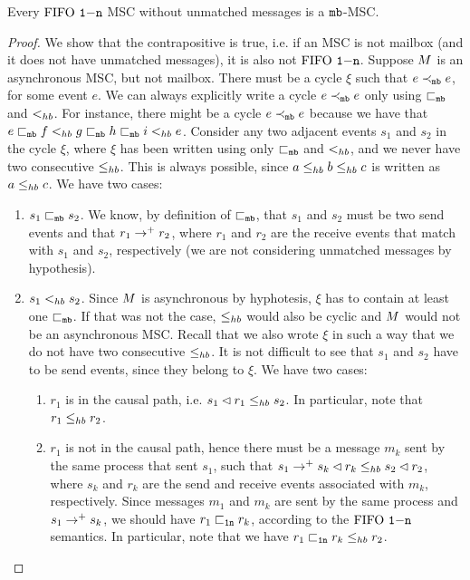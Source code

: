\begin{proposition} \label{prop:onen_mb_no_unmatched}
	Every $\text{FIFO } \mathtt{1\mathsf{-}n}$ MSC without unmatched messages is a $\mathtt{mb}$-MSC.
\end{proposition}
\begin{proof}
We show that the contrapositive is true, i.e. if an MSC is not mailbox (and it does not have unmatched messages), it is also not $\text{FIFO } \mathtt{1\mathsf{-}n}$. Suppose $M$ is an asynchronous MSC, but not mailbox. There must be a cycle $\xi$ such that  
$e \prec_{\mathtt{mb}} e$, for some event $e$. 
We can always explicitly  write a cycle $e \prec_{\mathtt{mb}} e$ only using $\sqsubset_{\mathtt{mb}}$ and $<_{hb}$. For instance, there might be a cycle $e \prec_{\mathtt{mb}} e$ because we have that $e \sqsubset_{\mathtt{mb}} f <_{hb} g \sqsubset_{\mathtt{mb}} h \sqsubset_{\mathtt{mb}} i <_{hb} e$. Consider any two adjacent events $s_1$ and $s_2$ in the cycle $\xi$, where $\xi$ has been written using only $\sqsubset_{\mathtt{mb}}$ and $<_{hb}$, and we never have two consecutive $\leq_{hb}$. This is always possible, since $a \leq_{hb} b \leq_{hb} c$ is written as $a \leq_{hb} c$. We have two cases:
\begin{enumerate}
	\item $s_1 \sqsubset_{\mathtt{mb}} s_2$. We know, by definition of $\sqsubset_{\mathtt{mb}}$, that $s_1$ and $s_2$ must be two send events and that $r_1 \to^+ r_2$, where $r_1$ and $r_2$ are the receive events that match with $s_1$ and $s_2$, respectively (we are not considering unmatched messages by hypothesis).
	\item $s_1 <_{hb} s_2$. Since $M$ is asynchronous by hyphotesis, $\xi$ has to contain at least one $\sqsubset_{\mathtt{mb}}$. If that was not the case, $\leq_{hb}$ would also be cyclic and $M$ would not be an asynchronous MSC. Recall that we also wrote $\xi$ in such a way that we do not have two consecutive $\leq_{hb}$. It is not difficult to see that $s_1$ and $s_2$ have to be send events, since they belong to $\xi$. We have two cases:
	\begin{enumerate}
		\item $r_1$ is in the causal path, i.e. $s_1 \lhd r_1 \leq_{hb} s_2$. In particular, note that $r_1 \leq_{hb} r_2$.
		\item $r_1$ is not in the causal path, hence there must be a message $m_k$ sent by the same process that sent $s_1$, such that $s_1 \to^+ s_k \lhd r_k \leq_{hb} s_2 \lhd r_2$, where $s_k$ and $r_k$ are the send and receive events associated with $m_k$, respectively. Since messages $m_1$ and $m_k$ are sent by the same process and $s_1 \to^+ s_k$, we should have $r_1 \sqsubset_{\mathtt{1n}} r_k$, according to the $\text{FIFO } \mathtt{1\mathsf{-}n}$ semantics. In particular, note that we have $r_1 \sqsubset_{\mathtt{1n}} r_k \leq_{hb} r_2$.

\end{enumerate}
\end{enumerate}
\end{proof}
